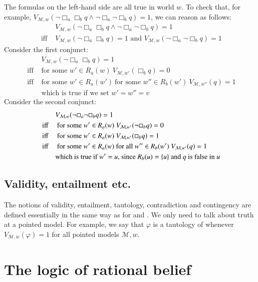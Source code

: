 \documentclass[nobib,nofonts]{tufte-handout}
\newcommand{\proplog}{\acro{PropLog}}
\newcommand{\predlog}{\acro{PredLog}}
\newcommand{\Bel}{\ensuremath{\Box}}
\newcommand{\Model}{\ensuremath{\mathcal{M}}}
\newcommand{\modlog}{\acro{ModLog}}
\begin{document}
The formulas on the left-hand side are all true in world $w$.
To check that, for example, $V_{\Model, w}(\neg \Bel_a \Bel_b q \wedge \neg \Bel_a \neg \Bel_b q) = 1$, we can reason as follows:
\begin{align*}
  & V_{\Model, w}(\neg \Bel_a \Bel_b q \wedge \neg \Bel_a \neg \Bel_b q) = 1 \\
  \text{ iff \ \ \ } & V_{\Model, w}(\neg \Bel_a \Bel_b q) = 1 \text {\ \ \  and \ \ \ }
                       V_{\Model, w}(\neg \Bel_a \neg \Bel_b q) = 1
\end{align*}
Consider the first conjunct:
\begin{align*}
  & V_{\Model, w}(\neg \Bel_a \Bel_b q) = 1 \\
  \text{ iff \ \ \ } & \text{for some } w' \in R_{a}(w) \  V_{\Model, w'}(\Bel_b q) = 0 \\
  \text{ iff \ \ \ } & \text{for some } w' \in R_{a}(w') \ \text{for some } w'' \in R_{b}(w') \  V_{\Model, w''}(q) = 1 \\
  & \text{which is true if we set $w' = w'' = v$}
\end{align*}
Consider the second conjunct:
\begin{align*}
  & V_{\Model, w}(\neg \Bel_a \neg \Bel_b q) = 1 \\
  \text{ iff \ \ \ } & \text { for some } w' \in R_{a}(w)\  V_{\Model, w'}(\neg \Bel_b q) = 0 \\
  \text{ iff \ \ \ } & \text { for some } w' \in R_{a}(w)\  V_{\Model, w'}(\Bel_b q) = 1 \\
  \text{ iff \ \ \ } & \text { for some } w' \in R_{a}(w)\ \text{for all } w'' \in R_{b}(w') \  V_{\Model, w'}(q) = 1 \\
  & \text{which is true if $w' = u$, since $R_{b}(u) = \set{u}$ and $q$ is false in $u$}
\end{align*}

\subsection{Validity, entailment etc.}

The notions of validity, entailment, tautology, contradiction and contingency are defined essentially in the same way as for \proplog and \predlog.
We only need to talk about truth at a pointed model.
For example, we say that $\varphi$ is a tautology of \modlog whenever $V_{\Model, w}(\varphi)=1$ for all pointed models $\Model, w$.

\section{The logic of rational belief}
\end{document}
